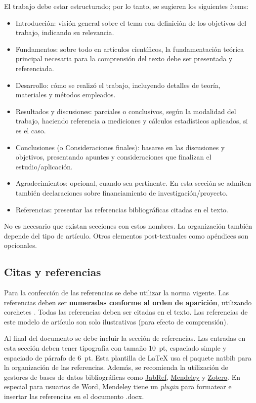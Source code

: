 El trabajo debe estar estructurado; por lo tanto, se sugieren los siguientes ítems:
%
\begin{itemize}[noitemsep,topsep=0ex] \itemsep=3pt
	\item Introducción: visión general sobre el tema con definición de los objetivos del trabajo, indicando su relevancia.
	\item Fundamentos: sobre todo en artículos científicos, la fundamentación teórica principal necesaria para la comprensión del texto debe ser presentada y referenciada.
	\item Desarrollo: cómo se realizó el trabajo, incluyendo detalles de teoría, materiales y métodos empleados.
	\item Resultados y discusiones: parciales o conclusivos, según la modalidad del trabajo, haciendo referencia a mediciones y cálculos estadísticos aplicados, si es el caso.
	\item Conclusiones (o Consideraciones finales): basarse en las discusiones y objetivos, presentando apuntes y consideraciones que finalizan el estudio/aplicación.
	\item Agradecimientos: opcional, cuando sea pertinente. En esta sección se admiten también declaraciones sobre financiamiento de investigación/proyecto.
	\item Referencias: presentar las referencias bibliográficas citadas en el texto.
\end{itemize}
%
No es necesario que existan secciones con estos nombres. La organización también depende del tipo de artículo.
Otros elementos post-textuales como apéndices son opcionales.


\subsection{Citas y referencias}

Para la confección de las referencias se debe utilizar la norma vigente. Las referencias deben ser \textbf{numeradas conforme al orden de aparición}, utilizando corchetes \cite{Gomes-2015}. Todas las referencias deben ser citadas en el texto. Las referencias \cite{Mareze-2017,Fonseca-2013,Brandao-2017,Gomes-2015,Oppenheim-2010,Muller-2001,Mareze-2019,aev:piccini2020} de este modelo de artículo son solo ilustrativas (para efecto de comprensión).

Al final del documento se debe incluir la sección de referencias. Las entradas en esta sección deben tener tipografía con tamaño 10~pt, espaciado simple y espaciado de párrafo de 6~pt. Esta plantilla de \LaTeX\xspace usa el paquete {\ttfamily natbib} para la organización de las referencias. Además, se recomienda la utilización de gestores de bases de datos bibliográficas como \href{http://www.jabref.org/}{JabRef}, \href{http://www.mendeley.com}{Mendeley} y \href{https://www.zotero.org/}{Zotero}. En especial para usuarios de Word, Mendeley tiene un \textit{plugin} para formatear e insertar las referencias en el documento .docx.

